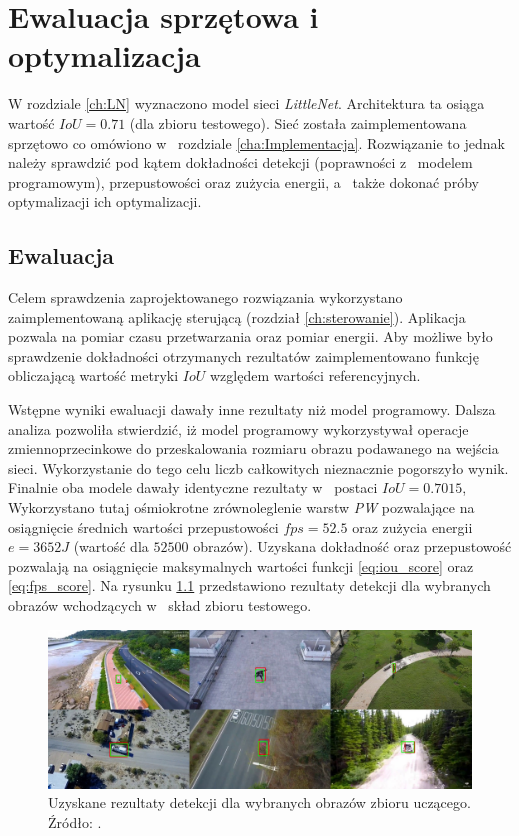 \chapter{Ewaluacja sprzętowa i optymalizacja}
\label{cha:Optymalizacja}

W rozdziale \ref{ch:LN} wyznaczono model sieci \emph{LittleNet}. 
Architektura ta osiąga wartość $IoU = 0.71$ (dla zbioru testowego). 
Sieć została zaimplementowana sprzętowo co omówiono w~ rozdziale \ref{cha:Implementacja}.
Rozwiązanie to jednak należy sprawdzić pod kątem dokładności detekcji (poprawności z~ modelem programowym), przepustowości oraz zużycia energii, a~ także dokonać próby optymalizacji ich optymalizacji. 


\section{Ewaluacja}
Celem sprawdzenia zaprojektowanego rozwiązania wykorzystano zaimplementowaną aplikację sterującą (rozdział \ref{ch:sterowanie}).
Aplikacja pozwala na pomiar czasu przetwarzania oraz pomiar energii.
Aby możliwe było sprawdzenie dokładności otrzymanych rezultatów zaimplementowano funkcję obliczającą wartość metryki $IoU$ względem wartości referencyjnych.

Wstępne wyniki ewaluacji dawały inne rezultaty niż model programowy.
Dalsza analiza pozwoliła stwierdzić, iż model programowy wykorzystywał operacje zmiennoprzecinkowe do przeskalowania rozmiaru obrazu podawanego na wejścia sieci.
Wykorzystanie do tego celu liczb całkowitych nieznacznie pogorszyło wynik.
Finalnie oba modele dawały identyczne rezultaty w~ postaci $IoU = 0.7015$, 
Wykorzystano tutaj ośmiokrotne zrównoleglenie warstw \emph{PW} pozwalające na osiągnięcie średnich wartości przepustowości $fps = 52.5$ oraz zużycia energii $e = 3652 J$ (wartość dla $52 500$ obrazów). 
Uzyskana dokładność oraz przepustowość pozwalają na osiągnięcie maksymalnych wartości funkcji \eqref{eq:iou_score} oraz \eqref{eq:fps_score}.
Na rysunku \ref{fig:results} przedstawiono rezultaty detekcji dla wybranych obrazów wchodzących w~ skład zbioru testowego.

\begin{figure}
    \centering
    \includegraphics[width=0.9\linewidth]{images/results.png}
    \caption{Uzyskane rezultaty detekcji dla wybranych obrazów zbioru uczącego. 
    Źródło: \cite{dac_sdc_2021}.}
    \label{fig:results}
\end{figure}

